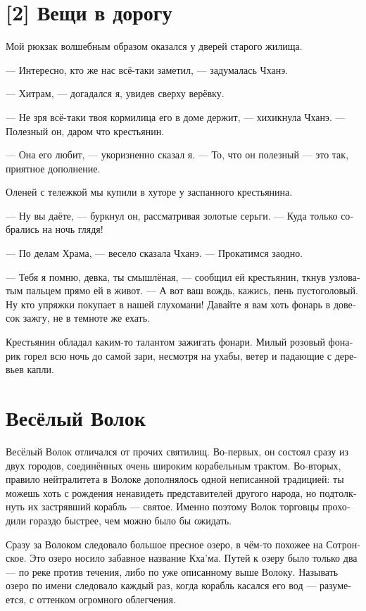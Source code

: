 \documentclass[a4paper,12pt,fleqn]{book}\usepackage{polyglossia}\setdefaultlanguage[babelshorthands=true]{russian}\setotherlanguage{english}\defaultfontfeatures{Ligatures=TeX,Mapping=tex-text}\usepackage{xcolor}\newcommand{\ml}[3]{#2}
\newcommand{\asterism}{\vspace{1em}{\centering\Large\bfseries$\ast~\ast~\ast$\par}\vspace{1em}}
\newcommand{\FM}{\footnotemark}
\newcommand{\FA}[1]{\footnotetext{#1 \emph{\ml{$0$}{---~Прим.~авт.}{---~Author.}}}}
\begin{document}
{\section{[2] Вещи в дорогу}

Мой рюкзак волшебным образом оказался у дверей старого жилища.

--- Интересно, кто же нас всё-таки заметил, --- задумалась Чханэ.

--- Хитрам, --- догадался я, увидев сверху верёвку.

--- Не зря всё-таки твоя кормилица его в доме держит, --- хихикнула Чханэ.
--- Полезный он, даром что крестьянин.

--- Она его любит, --- укоризненно сказал я.
--- То, что он полезный --- это так, приятное дополнение.

\asterism

Оленей с тележкой мы купили в хуторе у заспанного крестьянина.

--- Ну вы даёте, --- буркнул он, рассматривая золотые серьги.
--- Куда только собрались на ночь глядя!

--- По делам Храма, --- весело сказала Чханэ.
--- Прокатимся заодно.

--- Тебя я помню, девка, ты смышлёная, --- сообщил ей крестьянин, ткнув узловатым пальцем прямо ей в живот.
--- А вот ваш вождь, кажись, пень пустоголовый.
Ну кто упряжки покупает в нашей глухомани!
Давайте я вам хоть фонарь в довесок зажгу, не в темноте же ехать.

Крестьянин обладал каким-то талантом зажигать фонари.
Милый розовый фонарик горел всю ночь до самой зари, несмотря на ухабы, ветер и падающие с деревьев капли.

\section{Весёлый Волок}

Весёлый Волок отличался от прочих святилищ.
Во-первых, он состоял сразу из двух городов, соединённых очень широким корабельным трактом.
Во-вторых, правило нейтралитета в Волоке дополнялось одной неписанной традицией: ты можешь хоть с рождения ненавидеть представителей другого народа, но подтолкнуть их застрявший корабль --- святое.
Именно поэтому Волок торговцы проходили гораздо быстрее, чем можно было бы ожидать.

Сразу за Волоком следовало большое пресное озеро, в чём-то похожее на Сотронское.
Это озеро носило забавное название Кха'ма\FM.
\FA{
Наконец-то! добрались! (цатрон).
}
Путей к озеру было только два --- по реке против течения, либо по уже описанному выше Волоку.
Называть озеро по имени следовало каждый раз, когда корабль касался его вод --- разумеется, с оттенком огромного облегчения.

}
\end{document}
